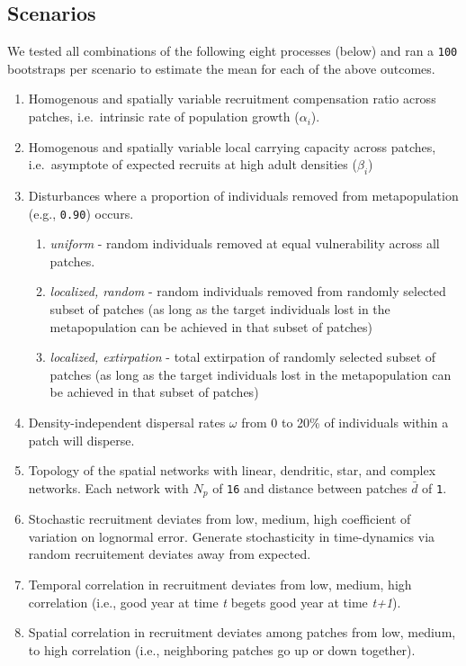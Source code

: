 \documentclass[]{article}
\providecommand{\tightlist}{%
  \setlength{\itemsep}{0pt}\setlength{\parskip}{0pt}}
\begin{document}
\hypertarget{scenarios}{%
\subsection{Scenarios}\label{scenarios}}

We tested all combinations of the following eight processes (below) and
ran a \texttt{100} bootstraps per scenario to estimate the mean for each
of the above outcomes.

\begin{enumerate}
\def\labelenumi{\arabic{enumi}.}
\item
  Homogenous and spatially variable recruitment compensation ratio
  across patches, i.e.~intrinsic rate of population growth
  (\(\alpha_i\)).
\item
  Homogenous and spatially variable local carrying capacity across
  patches, i.e.~asymptote of expected recruits at high adult densities
  (\(\beta_i\))
\item
  Disturbances where a proportion of individuals removed from
  metapopulation (e.g., \texttt{0.90}) occurs.

  \begin{enumerate}
  \def\labelenumii{\alph{enumii}.}
  \tightlist
  \item
    \emph{uniform} - random individuals removed at equal vulnerability
    across all patches.
  \item
    \emph{localized, random} - random individuals removed from randomly
    selected subset of patches (as long as the target individuals lost
    in the metapopulation can be achieved in that subset of patches)
  \item
    \emph{localized, extirpation} - total extirpation of randomly
    selected subset of patches (as long as the target individuals lost
    in the metapopulation can be achieved in that subset of patches)
  \end{enumerate}
\item
  Density-independent dispersal rates \(\omega\) from 0 to 20\% of
  individuals within a patch will disperse.
\item
  Topology of the spatial networks with linear, dendritic, star, and
  complex networks. Each network with \(N_p\) of \texttt{16} and
  distance between patches \(\bar{d}\) of \texttt{1}.
\item
  Stochastic recruitment deviates from low, medium, high coefficient of
  variation on lognormal error. Generate stochasticity in time-dynamics
  via random recruitement deviates away from expected.
\item
  Temporal correlation in recruitment deviates from low, medium, high
  correlation (i.e., good year at time \emph{t} begets good year at time
  \emph{t+1}).
\item
  Spatial correlation in recruitment deviates among patches from low,
  medium, to high correlation (i.e., neighboring patches go up or down
  together).
\end{enumerate}
\end{document}

